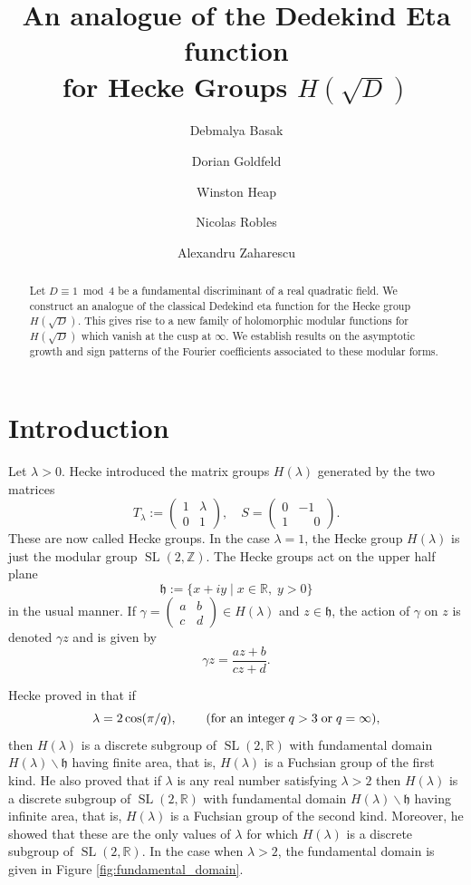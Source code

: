 \documentclass[11pt]{amsart}
\title[An analogue of the Dedekind Eta function for 
Hecke Groups $H(\sqrt{D})$]{\boldmath An analogue of the Dedekind Eta function \\
for 
Hecke Groups $H(\sqrt{D})$}
\author[Basak]{Debmalya Basak}
\author[Goldfeld]{Dorian Goldfeld}
\author[Heap]{Winston Heap}
\author[Robles]{Nicolas Robles}
\author[Zaharescu]{Alexandru Zaharescu}
\numberwithin{equation}{section}
\theoremstyle{remark}
\DeclareMathOperator{\SL}{SL}
\begin{document}

\maketitle
\begin{abstract}
Let $D\equiv 1\bmod{4}$ be a fundamental discriminant of a real quadratic field. We construct an analogue of the classical Dedekind eta function for the Hecke group $H(\sqrt{D})$. This gives rise to a new family of holomorphic modular functions for $H(\sqrt{D})$ which vanish at
the cusp at $\infty$. We establish results on the asymptotic growth and sign patterns of the Fourier coefficients associated to these modular forms.
\end{abstract}



\setcounter{tocdepth}{1}
\section{Introduction}\label{sec: Introduction} 
Let $\lambda>0$. Hecke \cite{Hecke} introduced the matrix groups $H(\lambda)$ generated by the two matrices
$$T_\lambda:= \begin{pmatrix} 1&\lambda\\0&1\end{pmatrix},\quad S = \begin{pmatrix} 0&-1\\1&\phantom{-}0\end{pmatrix}.$$ These are now called Hecke groups.
In the case $\lambda = 1$, the Hecke group $H(\lambda)$ is just the modular group $\SL(2,\mathbb Z).$  The Hecke groups act on the upper half plane $$\mathfrak h := \{x+iy\mid x\in\mathbb R,\; y>0\}$$ in the usual manner. If $\gamma=\left(\begin{smallmatrix} a&b\\c&d \end{smallmatrix}\right)\in H(\lambda)$ and $z\in\mathfrak h$, the action of $\gamma$ on $z$ is denoted $\gamma z$ and is given by $$\gamma z = \frac{az+b}{cz+d}.$$ 

\par
Hecke proved in \cite{Hecke}  that if 
$$\lambda = 2\cos(\pi/q),\;\qquad  (\text{\rm for an integer}\; q >3\; \text{\rm or} \; q=\infty),$$
then $H(\lambda)$ is a discrete subgroup of $\SL(2,\mathbb R)$ with fundamental domain $H(\lambda)\backslash \mathfrak h$ having finite area, that is, $H(\lambda)$ is a Fuchsian group of the first kind.  He also proved that if $\lambda$ is any real number satisfying
$\lambda > 2$ then $H(\lambda)$ is a discrete subgroup of $\SL(2,\mathbb R)$ with fundamental domain $H(\lambda)\backslash \mathfrak h$ having infinite area, that is, $H(\lambda)$ is a Fuchsian group of the second kind. Moreover, he showed that these are the only values of $\lambda$ for which $H(\lambda)$ is a discrete subgroup of $\SL(2,\mathbb R)$. In the case when $\lambda > 2$, the fundamental domain is given in Figure \ref{fig:fundamental_domain}.
\end{document}
